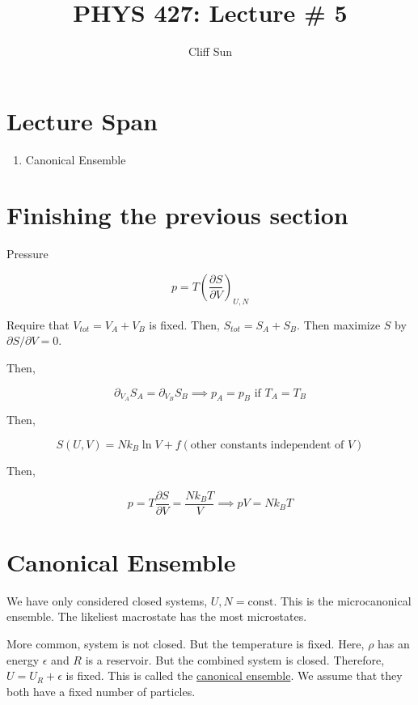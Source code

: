 \documentclass{article}
\title{PHYS 427: Lecture \# 5}
\author{Cliff Sun}
\newtheorem{one minute paper}[theorem]{One Minute Paper}
\begin{document}
\maketitle

\section*{Lecture Span}
\begin{enumerate}
    \item Canonical Ensemble
\end{enumerate}

\section*{Finishing the previous section}

Pressure 

\begin{equation}
    p =T \left( \frac{\partial S}{\partial V} \right)_{U,N}
\end{equation}

Require that $V_{tot} = V_A + V_B$ is fixed. Then, $S_{tot} = S_A + S_B$. Then maximize $S$ by $\partial S/ \partial V = 0$. 

Then, 

\begin{equation}
    \partial_{V_A}S_A = \partial_{V_B}S_B \implies p_A = p_B \text{ if } T_A = T_B
\end{equation}

Then, 

\begin{equation}
    S(U,V) = Nk_B \ln V + f(\text{other constants independent of $V$})
\end{equation}

Then, 

\begin{equation}
    p = T \frac{\partial S}{\partial V} = \frac{N k_B T}{V} \implies pV = N k_B T
\end{equation}

\section*{Canonical Ensemble}

We have only considered closed systems, $U,N=\text{const}$. This is the microcanonical ensemble. The likeliest macrostate has the most microstates.  

More common, system is not closed. But the temperature is fixed. Here, $\rho$ has an energy $\epsilon$ and $R$ is a reservoir. But the combined system is closed. Therefore, $U = U_R + \epsilon$ is fixed. This is called the \underline{canonical ensemble}. We assume that they both have a fixed number of particles. 
\end{document}
